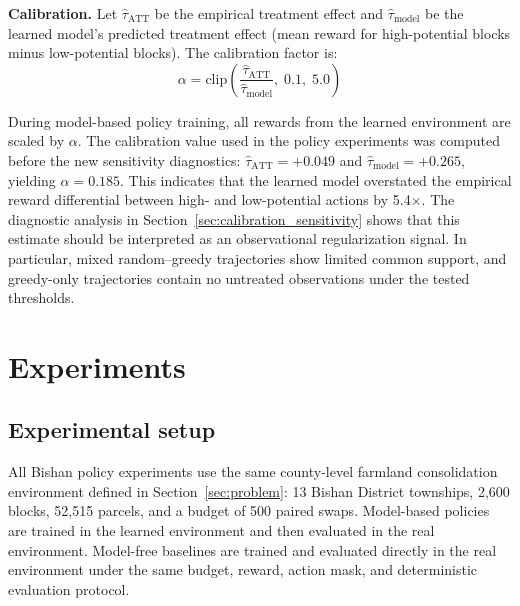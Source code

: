 \documentclass[11pt]{article}
\begin{document}
\textbf{Calibration.} Let $\hat{\tau}_\text{ATT}$ be the empirical treatment effect and $\hat{\tau}_\text{model}$ be the learned model's predicted treatment effect (mean reward for high-potential blocks minus low-potential blocks). The calibration factor is:
\begin{equation}
\alpha = \text{clip}\left(\frac{\hat{\tau}_\text{ATT}}{\hat{\tau}_\text{model}},\; 0.1,\; 5.0\right)
\end{equation}

During model-based policy training, all rewards from the learned environment are scaled by $\alpha$. The calibration value used in the policy experiments was computed before the new sensitivity diagnostics: $\hat{\tau}_\text{ATT} = +0.049$ and $\hat{\tau}_\text{model} = +0.265$, yielding $\alpha = 0.185$. This indicates that the learned model overstated the empirical reward differential between high- and low-potential actions by 5.4$\times$. The diagnostic analysis in Section~\ref{sec:calibration_sensitivity} shows that this estimate should be interpreted as an observational regularization signal. In particular, mixed random--greedy trajectories show limited common support, and greedy-only trajectories contain no untreated observations under the tested thresholds.


\section{Experiments}
\label{sec:experiments}

\subsection{Experimental setup}

All Bishan policy experiments use the same county-level farmland consolidation environment defined in Section~\ref{sec:problem}: 13 Bishan District townships, 2{,}600 blocks, 52{,}515 parcels, and a budget of 500 paired swaps. Model-based policies are trained in the learned environment and then evaluated in the real environment. Model-free baselines are trained and evaluated directly in the real environment under the same budget, reward, action mask, and deterministic evaluation protocol.
\end{document}

